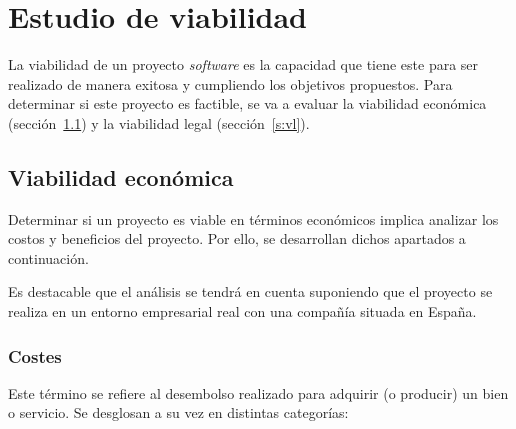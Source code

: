 \section{Estudio de viabilidad}

La viabilidad de un proyecto \textit{software} es la capacidad que tiene este para ser realizado de manera exitosa y cumpliendo los objetivos propuestos. Para determinar si este proyecto es factible, se va a evaluar la viabilidad económica (sección~\ref{s:ve}) y la viabilidad legal (sección~\ref{s:vl}).

\subsection{Viabilidad económica}
\label{s:ve}

Determinar si un proyecto es viable en términos económicos implica analizar los costos y beneficios del proyecto. Por ello, se desarrollan dichos apartados a continuación.

Es destacable que el análisis se tendrá en cuenta suponiendo que el proyecto se realiza en un entorno empresarial real con una compañía situada en España.

\subsubsection{Costes}

Este término se refiere al desembolso realizado para adquirir (o producir) un bien o servicio. Se desglosan a su vez en distintas categorías:

